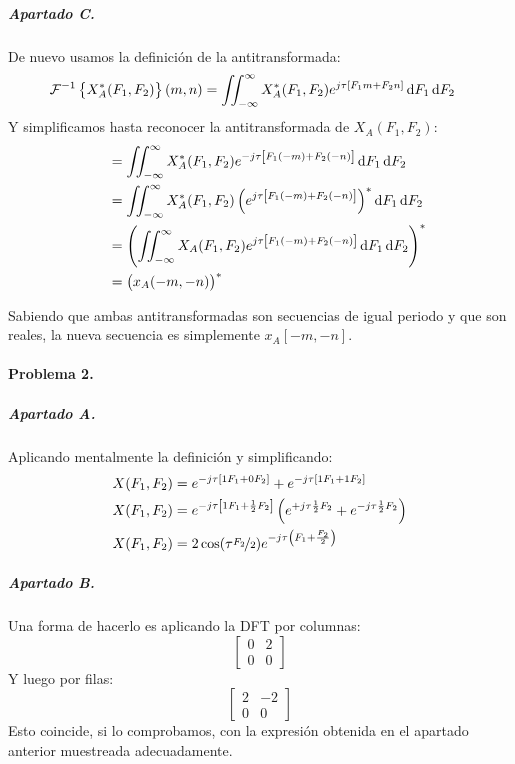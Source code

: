 \subparagraph{Apartado C.}

De nuevo usamos la definición de la antitransformada:
%
\begin{align*}
  \mathcal{F}^{-1}\left\{ X_A^*(F_1, F_2) \right\}(m, n) &=
  \iint_{-\infty}^{\infty} X_A^*(F_1, F_2) e^{j\tau\left[F_1 m + F_2 n\right]} \dif F_1 \dif F_2
\end{align*}
%
Y simplificamos hasta reconocer la antitransformada de $X_A(F_1, F_2)$:
%
\begin{align*}
  \quad &=
  \iint_{-\infty}^{\infty} X_A^*(F_1, F_2) e^{-j\tau\left[F_1 (-m) + F_2 (-n)\right]} \dif F_1 \dif F_2
\\
  \quad &=
  \iint_{-\infty}^{\infty} X_A^*(F_1, F_2) \left(e^{j\tau\left[F_1 (-m) + F_2 (-n)\right]}\right)^* \dif F_1 \dif F_2
\\
  \quad &=
  \left( \iint_{-\infty}^{\infty} X_A(F_1, F_2) e^{j\tau\left[F_1 (-m) + F_2 (-n)\right]} \dif F_1 \dif F_2 \right)^*
\\
  \quad &=
  \left( x_A(-m, -n) \right)^*
\end{align*}

Sabiendo que ambas antitransformadas son secuencias de igual periodo y
que son reales, la nueva secuencia es simplemente $x_A[-m, -n]$.

\finishpage


\startpage

\paragraph{Problema 2.}

\subparagraph{Apartado A.}

Aplicando mentalmente la definición y simplificando:
%
\begin{align*}
  X(F_1, F_2) &= e^{-j\tau\left[ 1F_1 + 0F_2 \right]} + e^{-j\tau\left[ 1F_1 + 1F_2 \right]}
\\
  X(F_1, F_2) &= e^{-j\tau\left[ 1F_1 + \frac{1}{2}F_2 \right]}
    \left( e^{+j\tau\frac{1}{2}F_2} + e^{-j\tau\frac{1}{2}F_2} \right)
\\
  X(F_1, F_2) &= 2 \cos(\tau\nicefrac{F_2}{2}) e^{-j\tau\left( F_1 + \frac{F_2}{2} \right)}
\end{align*}

\subparagraph{Apartado B.}

Una forma de hacerlo es aplicando la DFT por columnas:
%
\begin{equation*}
  \begin{bmatrix}
    0 & 2 \\
    0 & 0
  \end{bmatrix}
\end{equation*}
%
Y luego por filas:
%
\begin{equation*}
  \begin{bmatrix}
    2 & -2 \\
    0 & 0
  \end{bmatrix}
\end{equation*}
%
Esto coincide, si lo comprobamos, con la expresión obtenida en el apartado anterior muestreada
adecuadamente.

